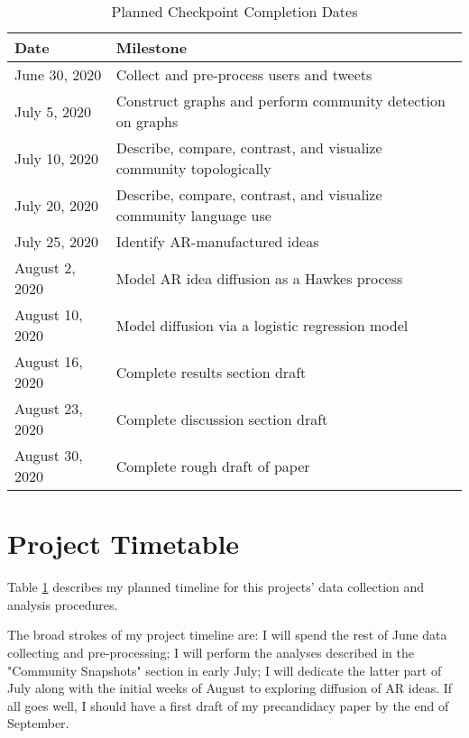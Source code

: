 \documentclass[acmlarge, screen, authorversion]{acmart}
\begin{document}
\begin{table}[htbp!]

	\caption{Planned Checkpoint Completion Dates}
	\label{table:timetable}

	\begin{tabular}{ l l  }

		\toprule
		Date               & Milestone                                                          \\
		\midrule
		June 30, 2020      & Collect and pre-process users and tweets                           \\
		\hline
		July 5, 2020       & Construct graphs and perform community detection on graphs         \\
		\hline
		July 10, 2020      & Describe, compare, contrast, and visualize community topologically \\
		\hline
		July 20, 2020      & Describe, compare, contrast, and visualize community language use  \\
		\hline
		July 25, 2020      & Identify AR-manufactured ideas                                     \\
		\hline
		August 2, 2020     & Model AR idea diffusion as a Hawkes process                        \\
		\hline
		August 10, 2020    & Model diffusion via a logistic regression model                  \\
		\hline
		August 16, 2020    & Complete results section draft                                     \\
		\hline
		August 23, 2020    & Complete discussion section draft                                   \\
		\hline
		August 30, 2020 & Complete rough draft of paper                                         \\
		\bottomrule
	\end{tabular}
\end{table}

\section{Project Timetable}

Table \ref{table:timetable} describes my planned timeline for this projects' data collection and analysis procedures.

The broad strokes of my project timeline are: I will spend the rest of June data collecting and pre-processing; I will perform the analyses described in the "Community Snapshots" section in early July; I will dedicate the latter part of July along with the initial weeks of August to exploring diffusion of AR ideas. If all goes well, I should have a first draft of my precandidacy paper by the end of September.

\clearpage


\end{document}
